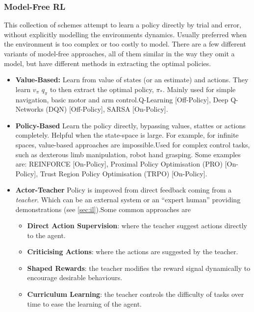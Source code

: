   \subsubsection{Model-Free RL}
  This collection of schemes attempt to learn a policy directly by trial and error, without explicitly modelling the environments dynamics. Usually preferred when the environment is too complex or too costly to model. There are a few different variants of model-free approaches, all of them similar in the way they omit a model, but have different methods in extracting the optimal policies.
  \begin{itemize}
    \item \textbf{Value-Based:} Learn from value of states (or an estimate) and actions. They learn $v_\pi$ $q_\pi$ to then extract the optimal policy, $\pi_*$. Mainly used for simple navigation, basic motor and arm control.Q-Learning [Off-Policy], Deep Q-Networks (DQN) [Off-Policy], SARSA [On-Policy]. 
    \item \textbf{Policy-Based} Learn the policy directly, bypassing values, stattes or actions completely. Helpful when the state-space is large. For example, for infinite spaces, value-based approaches are impossible.Used for complex control tasks, such as dexterous limb manipulation, robot hand grasping. Some examples are: REINFORCE [On-Policy], Proximal Policy Optimisation (PRO) [On-Policy], Trust Region Policy Optimisation (TRPO) [On-Policy]. 
    \item \textbf{Actor-Teacher} Policy is improved from direct feedback coming from a \emph{teacher}. Which can be an external system or an ``expert human'' providing demonstrations (see \ref{sec:il}).Some common approaches are
      \begin{itemize}
        \item \textbf{Direct Action Supervision}: where the teacher suggest actions directly to the agent.
        \item \textbf{Criticising Actions}: where the actions are suggested by the teacher.
        \item \textbf{Shaped Rewards}: the teacher modifies the reward signal dynamically to encourage desirable behaviours.
        \item \textbf{Curriculum Learning}: the teacher controls the difficulty of tasks over time to ease the learning of the agent.
      \end{itemize}
  \end{itemize}
  
